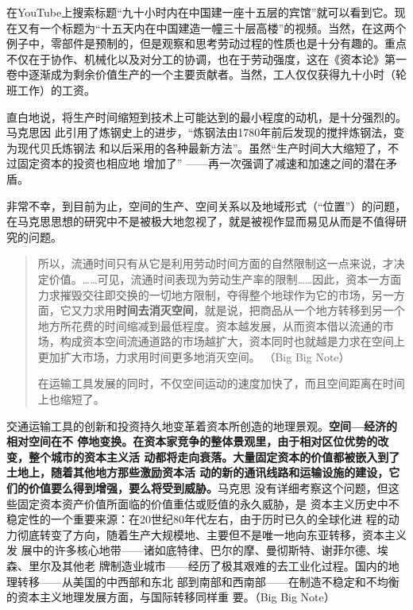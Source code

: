 在YouTube上搜索标题“九十小时内在中国建一座十五层的宾馆”就可以看到它。现在又有一个标题为“十五天内在中国建造一幢三十层高楼”的视频。当然，在这两个例子中，零部件是预制的，但是观察和思考劳动过程的性质也是十分有趣的。重点不仅在于协作、机械化以及对分工的协调，也在于劳动强度，这在《资本论》第一卷中逐渐成为剩余价值生产的一个主要贡献者。当然，工人仅仅获得九十小时（轮班工作）的工资。

直白地说，将生产时间缩短到技术上可能达到的最小程度的动机，是十分强烈的。马克思因
此引用了炼钢史上的进步，“炼钢法由1780年前后发现的搅拌炼钢法，变为现代贝氏炼钢法
和以后采用的各种最新方法”。虽然“生产时间大大缩短了，不过固定资本的投资也相应地
增加了” ——再一次强调了减速和加速之间的潜在矛盾。

非常不幸，到目前为止，空间的生产、空间关系以及地域形式（“位置”）的问题，在马克思思想的研究中不是被极大地忽视了，就是被视作显而易见从而是不值得研究的问题。

\begin{quotation}

  所以，流通时间只有从它是利用劳动时间方面的自然限制这一点来说，才决定价值。……可见，流通时间表现为劳动生产率的限制……因此，资本一方面力求摧毁交往即交换的一切地方限制，夺得整个地球作为它的市场，另一方面，它又力求用\textbf{时间去消灭空间}，就是说，把商品从一个地方转移到另一个地方所花费的时间缩减到最低程度。资本越发展，从而资本借以流通的市场，构成资本空间流通道路的市场越扩大，资本同时也就越是力求在空间上更加扩大市场，力求用时间更多地消灭空间。  （Big Big Note）

在运输工具发展的同时，不仅空间运动的速度加快了，而且空间距离在时间上也缩短了。 

\end{quotation}

交通运输工具的创新和投资持久地变革着资本所创造的地理景观。\textbf{空间—经济的相对空间在不
停地变换。在资本家竞争的整体景观里，由于相对区位优势的改变，整个城市的资本主义活
动都将走向衰落。大量固定资本的价值都被嵌入到了土地上，随着其他地方那些激励资本活
动的新的通讯线路和运输设施的建设，它们的价值要么得到增强，要么将受到威胁。}马克思
没有详细考察这个问题，但这些固定资本资产价值所面临的价值重估或贬值的永久威胁，是
资本主义历史中不稳定性的一个重要来源：在20世纪80年代左右，由于历时已久的全球化进
程的动力彻底转变了方向，随着生产大规模地、主要但不是唯一地向东亚转移，资本主义发
展中的许多核心地带——诸如底特律、巴尔的摩、曼彻斯特、谢菲尔德、埃森、里尔及其他老
牌制造业城市——经历了极其艰难的去工业化过程。国内的地理转移——从美国的中西部和东北
部到南部和西南部——在制造不稳定和不均衡的资本主义地理发展方面，与国际转移同样重
要。（Big Big Note）


